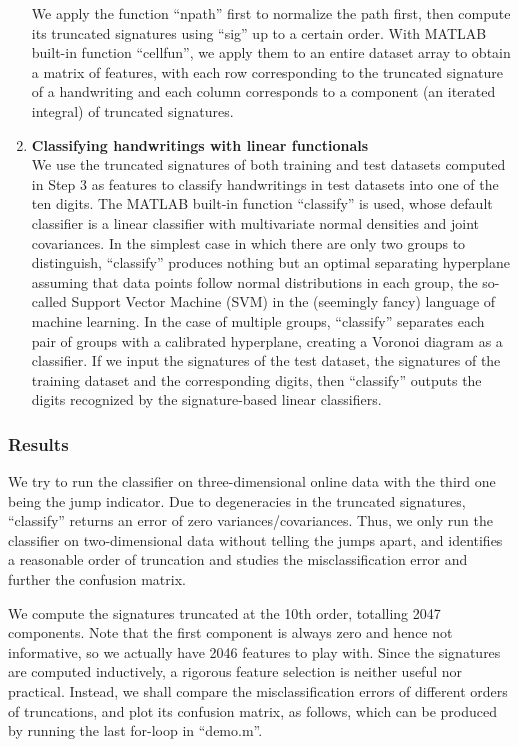\documentclass[fleqn]{article}
\theoremstyle{definition}
\theoremstyle{remark}
\begin{document}
\begin{enumerate}
\par
We apply the function ``npath'' first to normalize the path first, then compute its truncated signatures using ``sig'' up to a certain order. With MATLAB built-in function ``cellfun'', we apply them to an entire dataset array to obtain a matrix of features, with each row corresponding to the truncated signature of a handwriting and each column corresponds to a component (an iterated integral) of truncated signatures.

\item \textbf{Classifying handwritings with linear functionals} \\
We use the truncated signatures of both training and test datasets computed in Step 3 as features to classify handwritings in test datasets into one of the ten digits. The MATLAB built-in function ``classify'' is used, whose default classifier is a linear classifier with multivariate normal densities and joint covariances. In the simplest case in which there are only two groups to distinguish, ``classify'' produces nothing but an optimal separating hyperplane assuming that data points follow normal distributions in each group, the so-called Support Vector Machine (SVM) in the (seemingly fancy) language of machine learning. In the case of multiple groups, ``classify'' separates each pair of groups with a calibrated hyperplane, creating a Voronoi diagram as a classifier. If we input the signatures of the test dataset, the signatures of the training dataset and the corresponding digits, then ``classify'' outputs the digits recognized by the signature-based linear classifiers.
\end{enumerate}

\subsubsection{Results}
We try to run the classifier on three-dimensional online data with the third one being the jump indicator. Due to degeneracies in the truncated signatures, ``classify'' returns an error of zero variances/covariances. Thus, we only run the classifier on two-dimensional data without telling the jumps apart, and identifies a reasonable order of truncation and studies the misclassification error and further the confusion matrix.

\par
We compute the signatures truncated at the 10th order, totalling 2047 components. Note that the first component is always zero and hence not informative, so we actually have 2046 features to play with. Since the signatures are computed inductively, a rigorous feature selection is neither useful nor practical. Instead, we shall compare the misclassification errors of different orders of truncations, and plot its confusion matrix, as follows, which can be produced by running the last for-loop in ``demo.m''.
\end{document}

